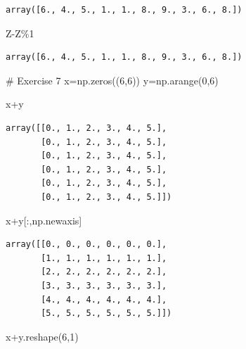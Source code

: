 \documentclass[
  a4paper,
  DIV=11,
  numbers=noendperiod]{scrreprt}
\newenvironment{Shaded}{\begin{snugshade}}{\end{snugshade}}
\newcommand{\CommentTok}[1]{\textcolor[rgb]{0.37,0.37,0.37}{#1}}
\newcommand{\DecValTok}[1]{\textcolor[rgb]{0.68,0.00,0.00}{#1}}
\newcommand{\NormalTok}[1]{\textcolor[rgb]{0.00,0.23,0.31}{#1}}
\newcommand{\OperatorTok}[1]{\textcolor[rgb]{0.37,0.37,0.37}{#1}}
\begin{document}
\begin{verbatim}
array([6., 4., 5., 1., 1., 8., 9., 3., 6., 8.])
\end{verbatim}

\begin{Shaded}
\begin{Highlighting}[]
\NormalTok{Z}\OperatorTok{{-}}\NormalTok{Z}\OperatorTok{\%}\DecValTok{1}
\end{Highlighting}
\end{Shaded}

\begin{verbatim}
array([6., 4., 5., 1., 1., 8., 9., 3., 6., 8.])
\end{verbatim}

\begin{Shaded}
\begin{Highlighting}[]
\CommentTok{\# Exercise 7}
\NormalTok{x}\OperatorTok{=}\NormalTok{np.zeros((}\DecValTok{6}\NormalTok{,}\DecValTok{6}\NormalTok{))}
\NormalTok{y}\OperatorTok{=}\NormalTok{np.arange(}\DecValTok{0}\NormalTok{,}\DecValTok{6}\NormalTok{)}
\end{Highlighting}
\end{Shaded}

\begin{Shaded}
\begin{Highlighting}[]
\NormalTok{x}\OperatorTok{+}\NormalTok{y}
\end{Highlighting}
\end{Shaded}

\begin{verbatim}
array([[0., 1., 2., 3., 4., 5.],
       [0., 1., 2., 3., 4., 5.],
       [0., 1., 2., 3., 4., 5.],
       [0., 1., 2., 3., 4., 5.],
       [0., 1., 2., 3., 4., 5.],
       [0., 1., 2., 3., 4., 5.]])
\end{verbatim}

\begin{Shaded}
\begin{Highlighting}[]
\NormalTok{x}\OperatorTok{+}\NormalTok{y[:,np.newaxis]}
\end{Highlighting}
\end{Shaded}

\begin{verbatim}
array([[0., 0., 0., 0., 0., 0.],
       [1., 1., 1., 1., 1., 1.],
       [2., 2., 2., 2., 2., 2.],
       [3., 3., 3., 3., 3., 3.],
       [4., 4., 4., 4., 4., 4.],
       [5., 5., 5., 5., 5., 5.]])
\end{verbatim}

\begin{Shaded}
\begin{Highlighting}[]
\NormalTok{x}\OperatorTok{+}\NormalTok{y.reshape(}\DecValTok{6}\NormalTok{,}\DecValTok{1}\NormalTok{)}
\end{Highlighting}
\end{Shaded}
\end{document}
